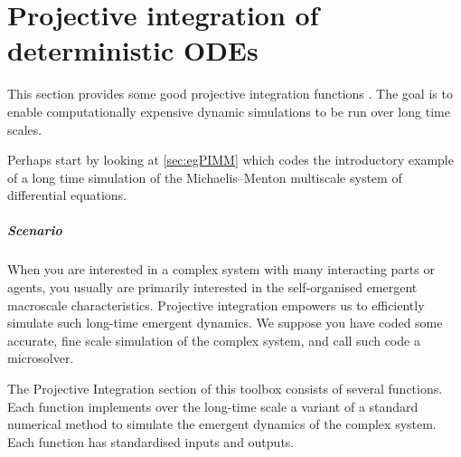 \chapter{Projective integration of deterministic ODEs}
\label{sec:ProjInt}
\localtableofcontents

This section provides some good projective integration functions \cite[e.g.]{Gear02b, Gear03c, Givon06, Sieber2018}.
The goal is to enable computationally expensive dynamic simulations to be run over long time scales.
\begin{userMan} 
Perhaps start by looking at \cref{sec:egPIMM} which codes the introductory example of a long time simulation of the Michaelis--Menton multiscale system of differential equations.
\end{userMan}

\paragraph{Scenario}
When you are interested in a complex system with many interacting parts or agents, you usually are primarily interested in the self-organised emergent macroscale characteristics.
Projective integration empowers us to efficiently simulate such long-time emergent dynamics.
We suppose you have coded some accurate, fine scale simulation of the complex system, and call such code a microsolver.

The Projective Integration section of this toolbox consists of several functions.
Each function implements over the long-time scale a variant of a standard numerical method to simulate the emergent dynamics of the complex system.
Each function has standardised inputs and outputs.


